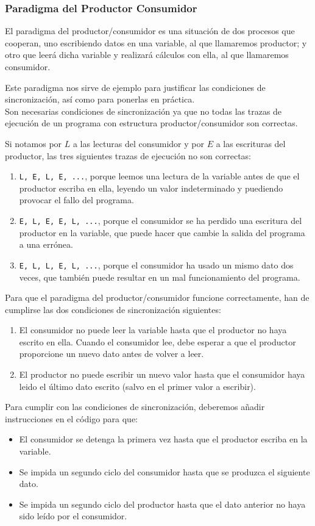 \subsubsection{Paradigma del Productor Consumidor}
El paradigma del productor/consumidor es una situación de dos procesos que cooperan, uno escribiendo datos en una variable, al que llamaremos productor; y otro que leerá dicha variable y realizará cálculos con ella, al que llamaremos consumidor.

Este paradigma nos sirve de ejemplo para justificar las condiciones de sincronización, así como para ponerlas en práctica.\\

Son necesarias condiciones de sincronización ya que no todas las trazas de ejecución de un programa con estructura productor/consumidor son correctas.

\begin{ejemplo}
    Si notamos por $L$ a las lecturas del consumidor y por $E$ a las escrituras del productor, las tres siguientes trazas de ejecución no son correctas:
    \begin{enumerate}
        \item \verb|L, E, L, E, ...|, porque leemos una lectura de la variable antes de que el productor escriba en ella, leyendo un valor indeterminado y puediendo provocar el fallo del programa.
        \item \verb|E, L, E, E, L, ...|, porque el consumidor se ha perdido una escritura del productor en la variable, que puede hacer que cambie la salida del programa a una errónea.
        \item \verb|E, L, L, E, L, ...|, porque el consumidor ha usado un mismo dato dos veces, que también puede resultar en un mal funcionamiento del programa.
    \end{enumerate}
\end{ejemplo}

Para que el paradigma del productor/consumidor funcione correctamente, han de cumplirse las dos condiciones de sincronización siguientes:
\begin{enumerate}
    \item El consumidor no puede leer la variable hasta que el productor no haya escrito en ella. Cuando el consumidor lee, debe esperar a que el productor proporcione un nuevo dato antes de volver a leer.
    \item El productor no puede escribir un nuevo valor hasta que el consumidor haya leido el último dato escrito (salvo en el primer valor a escribir).
\end{enumerate}
Para cumplir con las condiciones de sincronización, deberemos añadir instrucciones en el código para que:
\begin{itemize}
    \item El consumidor se detenga la primera vez hasta que el productor escriba en la variable.
    \item Se impida un segundo ciclo del consumidor hasta que se produzca el siguiente dato.
    \item Se impida un segundo ciclo del productor hasta que el dato anterior no haya sido leído por el consumidor.
\end{itemize}

